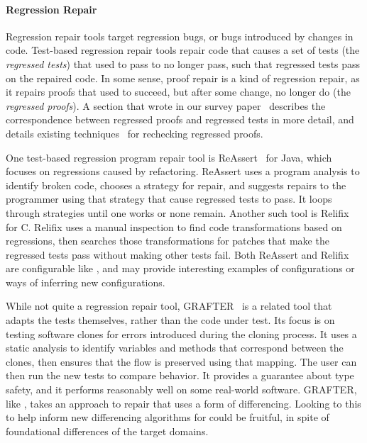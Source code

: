 \paragraph{Regression Repair}
Regression repair tools target regression bugs, or bugs introduced by changes in code.
Test-based regression repair tools repair code that causes a set of tests (the \textit{regressed tests}) that used to pass to no longer pass,
such that regressed tests pass on the repaired code.
In some sense, proof repair is a kind of regression repair, as it repairs
proofs that used to succeed, but after some change, no longer do (the \textit{regressed proofs}).
A section that  wrote in our survey paper~\cite{PGL-045} describes the correspondence between regressed proofs and regressed tests in more detail,
and details existing techniques~\cite{Palmskog2018, Wenzel2013MultiProcessing, Barras2013, Celik2017, Wenzel2013, Barras2015, deMoura2015, Wenzel2014, WenzelScalingIsabelle, WenzelFurtherScalingIsabelle} for rechecking regressed proofs.

One test-based regression program repair tool is ReAssert~\cite{daniel2009reassert} for Java,
which focuses on regressions caused by refactoring.
ReAssert uses a program analysis to identify broken code,
chooses a strategy for repair, and suggests repairs to the programmer using that strategy that cause regressed tests to pass.
It loops through strategies until one works or none remain.
Another such tool is Relifix~\cite{Tan:2015:RAR:2818754.2818813} for C.
Relifix uses a manual inspection to find code transformations based on regressions, then searches those transformations for 
patches that make the regressed tests pass without making other tests fail.
Both ReAssert and Relifix are configurable like \sysnamelong, and may provide interesting examples of configurations
or ways of inferring new configurations.

While not quite a regression repair tool, GRAFTER~\cite{Zhang:2017:ATD:3097368.3097448} is a related tool that adapts the tests themselves,
rather than the code under test. Its focus is on testing software clones for errors introduced during the
cloning process. It uses a static analysis to identify variables and methods that correspond between the clones,
then ensures that the flow is preserved using that mapping. The user can then run the new tests to compare behavior.
It provides a guarantee about type safety, and it performs reasonably well on some real-world software.
GRAFTER, like \toolnamec, takes an approach to repair that uses a form of differencing.
Looking to this to help inform new differencing algorithms for \sysnamelong could be fruitful,
in spite of foundational differences of the target domains.

